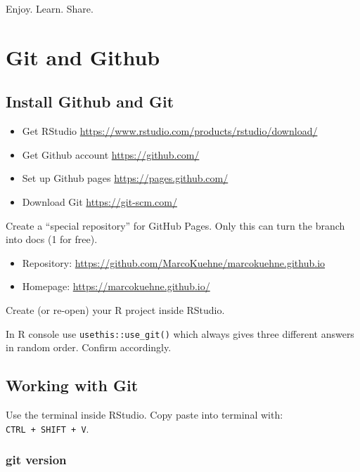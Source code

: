 \documentclass[
]{book}
\providecommand{\tightlist}{%
  \setlength{\itemsep}{0pt}\setlength{\parskip}{0pt}}
\begin{document}
Enjoy. Learn. Share.

\hypertarget{git-and-github}{%
\chapter{Git and Github}\label{git-and-github}}

\hypertarget{install-github-and-git}{%
\section{Install Github and Git}\label{install-github-and-git}}

\begin{itemize}
\tightlist
\item
  Get RStudio \url{https://www.rstudio.com/products/rstudio/download/}
\item
  Get Github account \url{https://github.com/}
\item
  Set up Github pages \url{https://pages.github.com/}
\item
  Download Git \url{https://git-scm.com/}
\end{itemize}

Create a ``special repository'' for GitHub Pages. Only this can turn the branch into docs (1 for free).

\begin{itemize}
\tightlist
\item
  Repository: \url{https://github.com/MarcoKuehne/marcokuehne.github.io}
\item
  Homepage: \url{https://marcokuehne.github.io/}
\end{itemize}

Create (or re-open) your R project inside RStudio.

In R console use \texttt{usethis::use\_git()} which always gives three different answers in random order. Confirm accordingly.

\hypertarget{working-with-git}{%
\section{Working with Git}\label{working-with-git}}

Use the terminal inside RStudio. Copy paste into terminal with: \texttt{CTRL\ +\ SHIFT\ +\ V}.

\hypertarget{git-version}{%
\subsection{git version}\label{git-version}}
\end{document}
